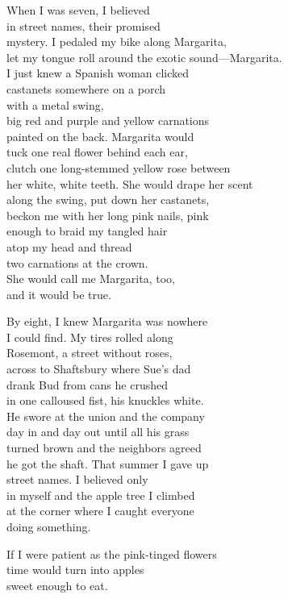 \documentclass[twoside,10pt]{book}
\begin{document}
When I was seven, I believed\\
in street names, their promised\\
mystery. I pedaled my bike along Margarita,\\
let my tongue roll around the exotic sound---Margarita.\\
I just knew a Spanish woman clicked\\
castanets somewhere on a porch\\
with a metal swing,\\
big red and purple and yellow carnations\\
painted on the back. Margarita would\\
tuck one real flower behind each ear,\\
clutch one long-stemmed yellow rose between\\
her white, white teeth. She would drape her scent\\
along the swing, put down her castanets,\\
beckon me with her long pink nails, pink\\
enough to braid my tangled hair\\
atop my head and thread\\
two carnations at the crown.\\
She would call me Margarita, too,\\
and it would be true.

By eight, I knew Margarita was nowhere\\
I could find. My tires rolled along\\
Rosemont, a street without roses,\\
across to Shaftsbury where Sue's dad\\
drank Bud from cans he crushed\\
in one calloused fist, his knuckles white.\\
He swore at the union and the company\\
day in and day out until all his grass\\
turned brown and the neighbors agreed\\
he got the shaft. That summer I gave up\\
street names. I believed only\\
in myself and the apple tree I climbed\\
at the corner where I caught everyone\\
doing something.

If I were patient as the pink-tinged flowers\\
time would turn into apples\\
sweet enough to eat.
\end{document}

